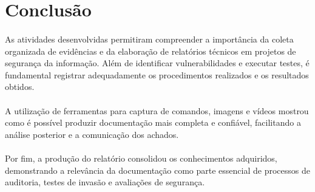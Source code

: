 \section{Conclusão}

\paragraph{}
As atividades desenvolvidas permitiram compreender a importância da coleta
organizada de evidências e da elaboração de relatórios técnicos em projetos de
segurança da informação. Além de identificar vulnerabilidades e executar
testes, é fundamental registrar adequadamente os procedimentos realizados e os
resultados obtidos.

\paragraph{}
A utilização de ferramentas para captura de comandos, imagens e vídeos mostrou
como é possível produzir documentação mais completa e confiável, facilitando a
análise posterior e a comunicação dos achados.

\paragraph{}
Por fim, a produção do relatório consolidou os conhecimentos adquiridos,
demonstrando a relevância da documentação como parte essencial de processos de
auditoria, testes de invasão e avaliações de segurança.
